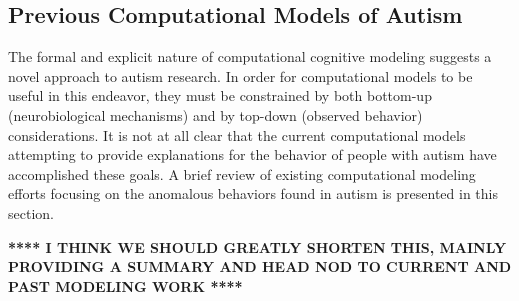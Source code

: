 


\subsection{Previous Computational Models of Autism}

The formal and explicit nature of computational cognitive modeling suggests a novel approach to autism research.  In order for computational models to be useful in this endeavor, they must be constrained by both bottom-up (neurobiological mechanisms) and by top-down (observed behavior) considerations.  It is not at all clear that the current computational models attempting to provide explanations for the behavior of people with autism have accomplished these goals.  A brief review of existing computational modeling efforts focusing on the anomalous behaviors found in autism is presented in this section. 

\textbf{**** I THINK WE SHOULD GREATLY SHORTEN THIS, MAINLY PROVIDING A SUMMARY AND HEAD NOD TO CURRENT AND PAST MODELING WORK ****}

